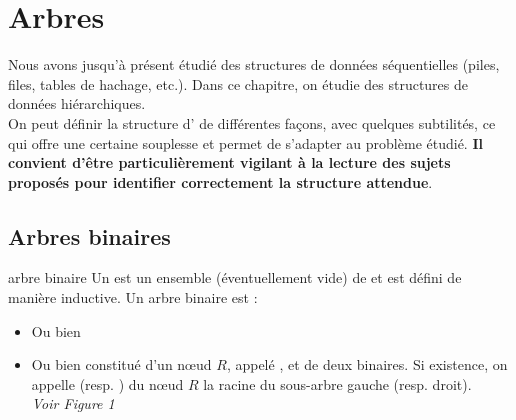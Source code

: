 



\setcounter{section}{6}
\section{Arbres}
Nous avons jusqu'à présent étudié des structures de données séquentielles (piles, files, tables de hachage, etc.). Dans ce chapitre, on étudie des structures de données hiérarchiques. \\
On peut définir la structure d' de différentes façons, avec quelques subtilités, ce qui offre une certaine souplesse et permet de s'adapter au problème étudié. \textbf{Il convient d'être particulièrement vigilant à la lecture des sujets proposés pour identifier correctement la structure attendue}.
\subsection{Arbres binaires}

\begin{definition}{7.1}{arbre binaire}
    Un  est un ensemble (éventuellement vide) de  et est défini de manière inductive. Un arbre binaire est : \begin{itemize}
        \item Ou bien 
        \item Ou bien constitué d'un nœud $R$, appelé , et de deux  binaires. Si existence, on appelle  (resp. ) du nœud $R$ la racine du sous-arbre gauche (resp. droit). \\ \textit{Voir Figure 1}
    \end{itemize}
\end{definition}

